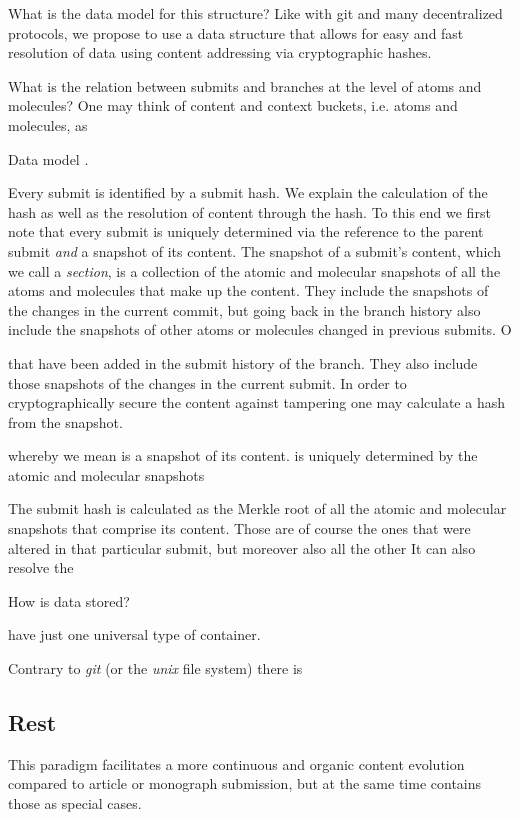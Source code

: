 \documentclass[14pt]{article}
\newcommand{\remark}[1]{{\color{purple} (#1)}}
\begin{document}
What is the data model for this structure? Like with git and many decentralized protocols, we propose to use a data structure that allows for easy and fast resolution of data using content addressing via cryptographic hashes.   

What is the relation between submits and branches at the level of atoms and molecules?
One may think of content and context buckets, i.e. atoms and molecules, as 

Data model .

Every submit is identified by a submit hash. We explain the calculation of the hash as well as the resolution of content through the hash. To this end we first note that every submit is uniquely determined via the reference to the parent submit \textit{and} a snapshot of its content. The snapshot of a submit's content, which we call a \textit{section}, is a collection of the atomic and molecular snapshots of all the atoms and molecules that make up the content. They include the snapshots of the changes in the current commit, but going back in the branch history also include the snapshots of other atoms or molecules changed in previous submits. O 

that have been added in the submit history of the branch. They also include those snapshots of the changes in the current submit. In order to cryptographically secure the content against tampering one may calculate a hash from the snapshot. 

whereby we mean   
is a snapshot of its content. is uniquely determined by the atomic and molecular snapshots

The submit hash is calculated as the Merkle root of all the atomic and molecular snapshots that comprise its content. Those are of course the ones that were altered in that particular submit, but moreover also all the other  It can also resolve the   

How is data stored?





have just one universal type of container.  


Contrary to \textit{git} \remark{or the \textit{unix} file system} there is 

\subsection{Rest}


 

This paradigm facilitates a more continuous and organic content evolution compared to article or monograph submission, but at the same time contains those as special cases.
\end{document}
